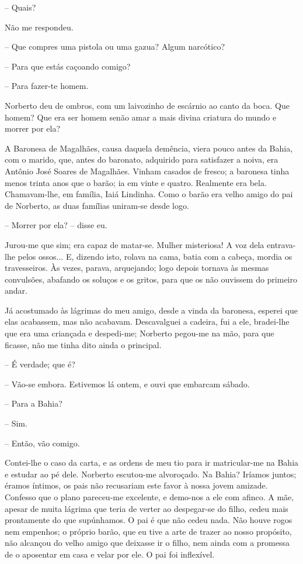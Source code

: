 -- Quais?

Não me respondeu.

-- Que compres uma pistola ou uma gazua? Algum narcótico?

-- Para que estás caçoando comigo?

-- Para fazer-te homem.

Norberto deu de ombros, com um laivozinho de escárnio ao canto da boca.
Que homem? Que era ser homem senão amar a mais divina criatura do mundo
e morrer por ela?

A Baronesa de Magalhães, causa daquela demência, viera pouco antes da
Bahia, com o marido, que, antes do baronato, adquirido para satisfazer a
noiva, era Antônio José Soares de Magalhães. Vinham casados de fresco; a
baronesa tinha menos trinta anos que o barão; ia em vinte e quatro.
Realmente era bela. Chamavam-lhe, em família, Iaiá Lindinha. Como o
barão era velho amigo do pai de Norberto, as duas famílias uniram-se
desde logo.

-- Morrer por ela? -- disse eu.

Jurou-me que sim; era capaz de matar-se. Mulher misteriosa! A voz dela
entrava-lhe pelos ossos... E, dizendo isto, rolava na cama, batia com a
cabeça, mordia os travesseiros. Às vezes, parava, arquejando; logo
depois tornava às mesmas convulsões, abafando os soluços e os gritos,
para que os não ouvissem do primeiro andar.

Já acostumado às lágrimas do meu amigo, desde a vinda da baronesa,
esperei que elas acabassem, mas não acabavam. Descavalguei a cadeira,
fui a ele, bradei-lhe que era uma criançada e despedi-me; Norberto
pegou-me na mão, para que ficasse, não me tinha dito ainda o principal.

-- É verdade; que é?

-- Vão-se embora. Estivemos lá ontem, e ouvi que embarcam sábado.

-- Para a Bahia?

-- Sim.

-- Então, vão comigo.

Contei-lhe o caso da carta, e as ordens de meu tio para ir matricular-me
na Bahia e estudar ao pé dele. Norberto escutou-me alvoroçado. Na Bahia?
Iríamos juntos; éramos íntimos, os pais não recusariam este favor à
nossa jovem amizade. Confesso que o plano pareceu-me excelente, e
demo-nos a ele com afinco. A mãe, apesar de muita lágrima que teria de
verter ao despegar-se do filho, cedeu mais prontamente do que
supúnhamos. O pai é que não cedeu nada. Não houve rogos nem empenhos; o
próprio barão, que eu tive a arte de trazer ao nosso propósito, não
alcançou do velho amigo que deixasse ir o filho, nem ainda com a
promessa de o aposentar em casa e velar por ele. O pai foi inflexível.

